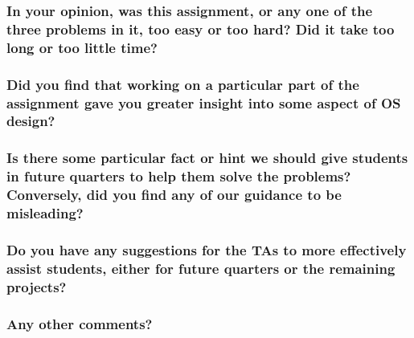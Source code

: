 \documentclass[sigconf, nonacm]{acmart}
\begin{document}
        \subsubsection*{In your opinion, was this assignment, or any one of the three problems in it, too easy or too hard? Did it take too long or too little time? }

        \subsubsection*{Did you find that working on a particular part of the assignment gave you greater insight into some aspect of OS design? }

        \subsubsection*{Is there some particular fact or hint we should give students in future quarters to help them solve the problems? Conversely, did you find any of our guidance to be misleading? }

        \subsubsection*{Do you have any suggestions for the TAs to more effectively assist students, either for future quarters or the remaining projects? }

        \subsubsection*{Any other comments? }
\end{document}
